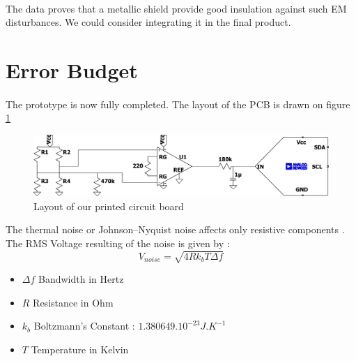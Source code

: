 \documentclass{article}[12pt]
\begin{document}
\paragraph{}
The data proves that a metallic shield provide good insulation against such EM disturbances. We could consider integrating it in the final product.
\section{Error Budget}
\paragraph{}
The prototype is now fully completed. The layout of the PCB is drawn on figure \ref{fig:layout}
\begin{figure}[H]
    \centering
    \includegraphics[width=\textwidth]{figures/layout.pdf}
    \caption{Layout of our printed circuit board}
    \label{fig:layout}
\end{figure}
The thermal noise or Johnson–Nyquist noise affects only resistive components \cite{Bucci-2020}. The RMS Voltage resulting of the noise is given by :
\begin{equation}
    V_{noise}=\sqrt{4Rk_bT\Delta f}
\end{equation}
\begin{itemize}
    \item $\Delta f$ Bandwidth in Hertz
    \item $R$ Resistance in Ohm
    \item $k_b$ Boltzmann's Constant : $1.380649.10^{-23} J.K^{-1}$ 
    \item $T$ Temperature in Kelvin
\end{itemize}
\end{document}
